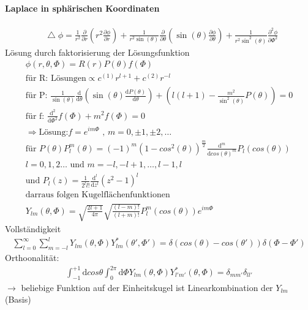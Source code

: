 \documentclass[a4paper]{article}
\newcommand*\laplace{\mathop{}\!\mathbin\bigtriangleup}
\begin{document}
\paragraph{Laplace in sphärischen Koordinaten}
\begin{align}
\laplace\phi=\frac{1}{r^2}\frac{\partial}{\partial r}\left( r^2
\frac{\partial\phi}{\partial r} \right)+\frac{1}{r^2 \sin(\theta)}
\frac{\partial}{\partial \theta}\left( \sin(\theta) \frac{\partial\phi} 
{\partial \theta} \right)+\frac{1}{r^2 \sin^2(\theta)} \frac{\partial^2\phi} 
{\partial \Phi^2}
\end{align}
Lösung durch faktorisierung der Lösungsfunktion 
\begin{align}
\phi(r,\theta,\Phi)=R(r)P(\theta)f(\Phi)\\
\text{für R:  Lösungen}\propto c^{(1)}r^{l+1}+c^{(2)} r^{-l}\\
\text{für P:  }\frac{1}{\sin(\theta)}\frac{\mathrm{d}}{\mathrm{d}\theta}\left( \sin(\theta)
\frac{\mathrm{d}P(\theta)}{\mathrm{d}\theta}\right)+\left( l(l+1)-\frac{m^2}{\sin^2(\theta)} 
P(\theta) \right)=0\\
\text{für f:  }\frac{\mathrm{d}^2}{\mathrm{d}\Phi^2}f(\Phi)+m^2f(\Phi)=0\\
\Rightarrow \text{Lösung:} f=e^{im\Phi} \text{ , }m=0,\pm1,\pm2,\ldots\\
\text{für }P(\theta) P_l^m(\theta)=(-1)^m
(1-cos^2(\theta))^{\frac{m}{2}}\frac{\mathrm{d}^m}{\mathrm{d}cos(\theta)^m}P_l(cos(\theta))\\
l=0,1,2\ldots \text{ und } m=-l,-l+1,\ldots,l-1,l\\
\text{und }P_l(z)=\frac{1}{2^ll!}\frac{\mathrm{d}^l}{\mathrm{d}z^l}(z^2-1)^l\\
\text{darraus folgen Kugelflächenfunktionen}\\
Y_{lm}(\theta,\Phi)=\sqrt{\frac{2l+1}{4\pi}}\sqrt{\frac{(l-m)!}{(l+m)!}}
P^m_l(cos(\theta))e^{im\Phi}
\end{align}
Vollständigkeit
\begin{align}
\sum_{l=0}^\infty\sum_{m=-l}^l Y_{lm}(\theta,\Phi) Y_{lm}^*(\theta',\Phi')
=\delta(cos(\theta)-cos(\theta'))\delta(\Phi-\Phi')
\end{align}
Orthoonalität:
\begin{align}
\int_{-1}^{+1}\mathrm{d}cos\theta\int_0^{2\pi}\mathrm{d}\Phi Y_{lm}(\theta,\Phi)
Y_{l'm'}^*(\theta,\Phi)=\delta_{mm'}\delta_{ll'}
\end{align}
$\rightarrow$ beliebige Funktion auf der Einheitskugel ist Linearkombination
der $Y_{lm}$ (Basis)
\end{document}
